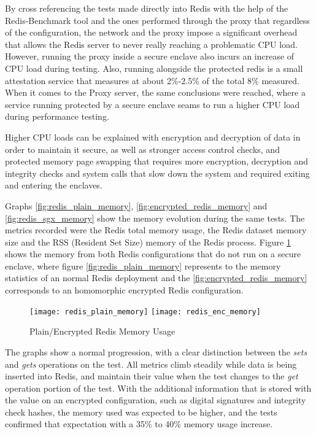 By cross referencing the tests made directly into Redis with the help of the Redis-Benchmark tool and the ones performed through the proxy that regardless of the configuration, the network and the proxy impose a significant overhead that allows the Redis server to never really reaching a problematic \gls{CPU} load. However, running the proxy inside a secure enclave also incurs an increase of \gls{CPU} load during testing. Also, running alongside the protected redis is a small attestation service that measures at about 2\%-2.5\% of the total 8\% measured. When it comes to the Proxy server, the same conclusions were reached, where a service running protected by a secure enclave seams to run a higher \gls{CPU} load during performance testing.

Higher \gls{CPU} loads can be explained with encryption and decryption of data in order to maintain it secure, as well as stronger access control checks, and protected memory page swapping that requires more encryption, decryption and integrity checks and system calls that slow down the system and required exiting and entering the enclaves.

Graphs \ref{fig:redis_plain_memory}, \ref{fig:encrypted_redis_memory} and \ref{fig:redis_sgx_memory} show the memory evolution during the same tests. The metrics recorded were the Redis total memory usage, the Redis dataset memory size and the \gls{RSS} (Resident Set Size) memory of the Redis process. Figure \ref {fig:redis_plain_enc_memory_results} shows the memory from both Redis configurations that do not run on a secure enclave, where figure \ref{fig:redis_plain_memory} represents to the memory statistics of an normal Redis deployment and the  \ref{fig:encrypted_redis_memory} corresponds to an homomorphic encrypted Redis configuration.

\begin{figure}[htbp]
\hspace*{-8mm}
  \centering
    {\texttt{[image: redis\_plain\_memory]}}%
    {\texttt{[image: redis\_enc\_memory]}}%
  \caption{Plain/Encrypted Redis Memory Usage}
  \label{fig:redis_plain_enc_memory_results}
\end{figure}

The graphs show a normal progression, with a clear distinction between the \textit{sets} and \textit{gets} operations on the test. All metrics climb steadily while data is being inserted into Redis, and maintain their value when the test changes to the \textit{get} operation portion of the test. With the additional information that is stored with the value on an encrypted configuration, such as digital signatures and integrity check hashes, the memory used was expected to be higher, and the tests confirmed that expectation with a 35\% to 40\% memory usage increase.


